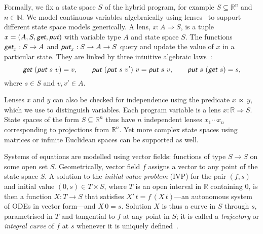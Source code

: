 \documentclass[envcountsame,envcountsect]{llncs}
\newcommand{\reals}{\mathbb{R}}
\newcommand{\lput}{\textit{\textsf{put}}}
\newcommand{\lget}{\textit{\textsf{get}}}
\newcommand{\lto}{\Longrightarrow}
\newcommand{\lindep}{\mathop{\,\bowtie\,}}
\begin{document}
Formally, we fix a state space $S$ of the hybrid program,
for example $S\subseteq \reals^n$ and $n\in\mathbb{N}$. We
model continuous variables algebraically using
lenses~\cite{FosterZW16} to support different state space
models generically. A lens, $x : A \lto S$, is a tuple
$x = (A, S, \lget, \lput)$ with variable type $A$ and state
space $S$. The functions $\lget_x : S \to A$ and
$\lput_x : S \to A \to S$ query and update the value of $x$
in a particular state. They are linked by three intuitive
algebraic laws~\cite{FosterZW16}:
\begin{equation*}
\lget~(\lput~s~v) = v, \qquad \lput~(\lput~s~v')~v = \lput~s~v, \qquad
\lput~s~(\lget~s) = s,
\end{equation*}
where $s \in S$ and $v, v' \in A$.

Lenses $x$ and $y$ can also be checked for independence
using the predicate $x \lindep y$, which we use to
distinguish variables. Each program variable is a lens
$x : \reals \lto S$. State spaces of the form
$S \subseteq \reals^n$ thus have $n$ independent lenses
$x_1 \cdots x_n$ corresponding to projections from
$\reals^n$. Yet more complex state spaces using matrices or
infinite Euclidean spaces can be supported as well.

Systems of equations are modelled using vector fields: functions of
type $S\to S$ on some open set $S$. Geometrically, vector field $f$
assigns a vector to any point of the state space $S$. A solution to
the \emph{initial value problem} (IVP) for the pair $(f,s)$ and
initial value $(0,s)\in T\times S$, where $T$ is an open interval in
$\reals$ containing $0$, is then a function $X:T\to S$ that satisfies
$X'\, t = f\, (X\, t)$---an autonomous system of ODEs in vector
form---and $X\, 0 = s$. Solution $X$ is thus a curve in $S$ through
$s$, parametrised in $T$ and tangential to $f$ at any point in $S$; it
is called a \emph{trajectory} or \emph{integral curve} of $f$ at $s$
whenever it is uniquely defined~\cite{Teschl12}.
\end{document}
